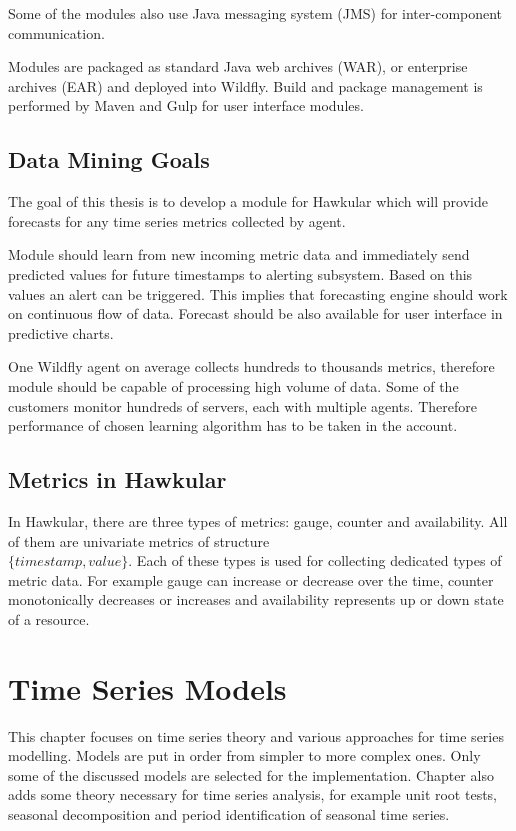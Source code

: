     Some of the modules also use Java messaging system (JMS) for inter-component communication.

    Modules are packaged as standard Java web archives (WAR), or enterprise archives (EAR) and deployed into Wildfly.
    Build and package management is performed by Maven and Gulp for user interface modules.

    \section{Data Mining Goals} \label{sec:goals}
    The goal of this thesis is to develop a module for Hawkular which will provide forecasts for any time series
    metrics collected by agent.

    Module should learn from new incoming metric data and immediately send predicted values for future timestamps to
    alerting subsystem. Based on this values an alert can be triggered. This implies that forecasting engine should
    work on continuous flow of data. Forecast should be also available for user interface in predictive charts.

    One Wildfly agent on average collects hundreds to thousands metrics, therefore module should be capable of
    processing high volume of data. Some of the customers monitor hundreds of servers, each with multiple agents.
    Therefore performance of chosen learning algorithm has to be taken in the account.

    \section{Metrics in Hawkular} \label{sec:metrics-in-hawkular}
    In Hawkular, there are three types of metrics: gauge, counter and availability. All of them are univariate metrics
    of structure \\$\{timestamp, value\}$. Each of these types is used for collecting dedicated types of metric data.
    For example gauge can increase or decrease over the time, counter monotonically decreases or increases and
    availability represents up or down state of a resource.

\chapter{Time Series Models} \label{chap:models}
This chapter focuses on time series theory and various approaches for time series modelling. Models are put in
order from simpler to more complex ones. Only some of the discussed models are selected for the implementation.
Chapter also adds some theory necessary for time series analysis, for example unit root tests,
seasonal decomposition and period identification of seasonal time series.

